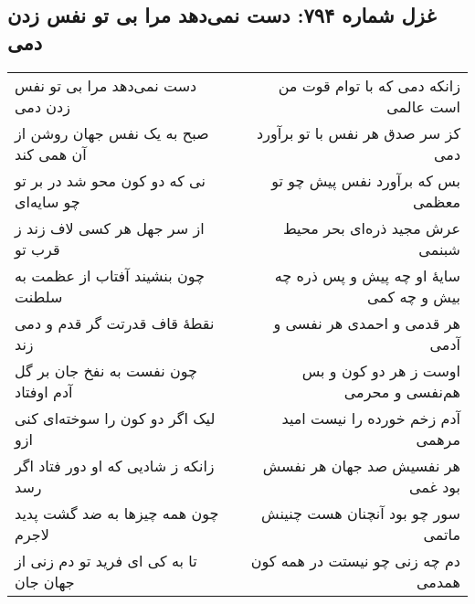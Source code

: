 \begin{center}
\section*{غزل شماره ۷۹۴: دست نمی‌دهد مرا بی تو نفس زدن دمی}
\label{sec:794}
\begin{longtable}{l p{0.5cm} r}
دست نمی‌دهد مرا بی تو نفس زدن دمی
&&
زانکه دمی که با توام قوت من است عالمی
\\
صبح به یک نفس جهان روشن از آن همی کند
&&
کز سر صدق هر نفس با تو برآورد دمی
\\
نی که دو کون محو شد در بر تو چو سایه‌ای
&&
بس که برآورد نفس پیش چو تو معظمی
\\
از سر جهل هر کسی لاف زند ز قرب تو
&&
عرش مجید ذره‌ای بحر محیط شبنمی
\\
چون بنشیند آفتاب از عظمت به سلطنت
&&
سایهٔ او چه پیش و پس ذره چه بیش و چه کمی
\\
نقطهٔ قاف قدرتت گر قدم و دمی زند
&&
هر قدمی و احمدی هر نفسی و آدمی
\\
چون نفست به نفخ جان بر گل آدم اوفتاد
&&
اوست ز هر دو کون و بس هم‌نفسی و محرمی
\\
لیک اگر دو کون را سوخته‌ای کنی ازو
&&
آدم زخم خورده را نیست امید مرهمی
\\
زانکه ز شادیی که او دور فتاد اگر رسد
&&
هر نفسیش صد جهان هر نفسش بود غمی
\\
چون همه چیزها به ضد گشت پدید لاجرم
&&
سور چو بود آنچنان هست چنینش ماتمی
\\
تا به کی ای فرید تو دم زنی از جهان جان
&&
دم چه زنی چو نیستت در همه کون همدمی
\\
\end{longtable}
\end{center}
